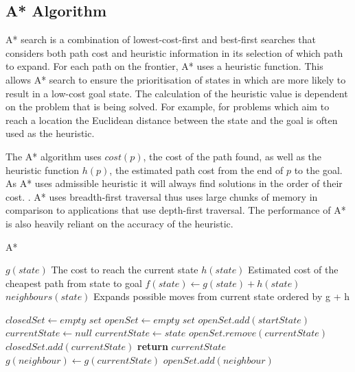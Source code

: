 \documentclass[final]{cmpreport}
\begin{document}
\subsection{A* Algorithm}
A* search is a combination of lowest-cost-first and best-first searches that considers both path cost and heuristic information in its selection of which path to expand. For each path on the frontier, A* uses a heuristic function. This allows A* search to ensure the prioritisation of states in which are more likely to result in a low-cost goal state. The calculation of the heuristic value is dependent on the problem that is being solved. For example, for problems which aim to reach a location the Euclidean distance between the state and the goal is often used as the heuristic. 

The A* algorithm uses $cost(p)$, the cost of the path found, as well as the heuristic function $h(p)$, the estimated path cost from the end of $p$ to the goal. As A* uses admissible heuristic it will always find solutions in the order of their cost. \citep{DBLP:journals/ker/Brewka96}.  A* uses breadth-first traversal thus uses large chunks of memory in comparison to applications that use depth-first traversal. The performance of A* is also heavily reliant on the accuracy of the heuristic.

	\begin{algorithm}
	\caption{A*}\label{Astar}
	\begin{algorithmic}[1]
		\State $g(state)$ \Comment The cost to reach the current state
		\State $h(state)$ \Comment Estimated cost of the cheapest path from state to goal
		\State $f(state) \gets g(state)+h(state)$
		\State $neighbours(state)$ \Comment Expands possible moves from current state ordered by g + h
		
		\State $closedSet \gets \textit{empty set}$
		\State $openSet \gets \textit{empty set}$
		\State $openSet.add(startState)$
		\State $currentState \gets null$
		\State $currentState \gets state$
		\EndIf
		\EndFor
		\State $openSet.remove(currentState)$
		\State $closedSet.add(currentState)$
		\State \textbf{return} $currentState$
		\EndIf
		\State$g(neighbour) \gets g(currentState)$
		\EndIf	
		\Else
		\State $openSet.add(neighbour)$	
		\EndIf
		\EndIf
		
		\EndFor
		\EndWhile
		\EndProcedure
	\end{algorithmic}
\end{algorithm}
\end{document}
